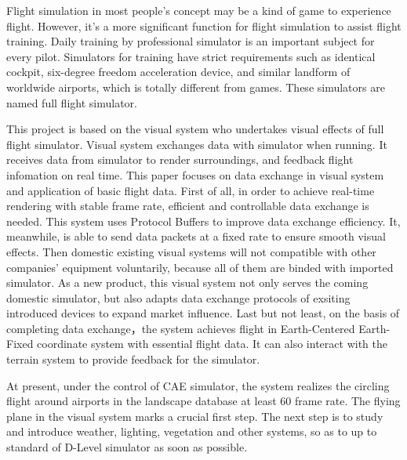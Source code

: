 \begin{abstract*}
    {Flight simulation in most people's concept may be a kind of game to experience flight. 
    However, it's a more significant function for flight simulation to assist flight training. Daily training by professional simulator is an important subject for every pilot.
    Simulators for training have strict requirements such as identical cockpit, six-degree freedom acceleration device, and similar landform of worldwide airports, which is totally different from games. These simulators are named full flight simulator.}
    \par
    This project is based on the visual system who undertakes visual effects of full flight simulator. Visual system exchanges data with simulator when running. It receives data from simulator to render surroundings, and feedback flight infomation on real time.
    This paper focuses on data exchange in visual system and application of basic flight data. First of all, in order to achieve real-time rendering with stable frame rate, efficient and controllable data exchange is needed. This system uses Protocol Buffers to improve data exchange efficiency.
    It, meanwhile, is able to send data packets at a fixed rate to ensure smooth visual effects.
    Then domestic existing visual systems will not compatible with other companies' equipment voluntarily, because all of them are binded with imported simulator.
    As a new product, this visual system not only serves the coming domestic simulator, but also adapts data exchange protocols of exsiting introduced devices to expand market influence. 
    Last but not least, on the basis of completing data exchange，the system achieves flight in Earth-Centered Earth-Fixed coordinate system with essential flight data. It can also interact with the terrain system to provide feedback for the simulator.
    \par
    At present, under the control of CAE simulator, the system realizes the circling flight around airports in the landscape database at least 60 frame rate. The flying plane in the visual system marks a crucial first step.
    The next step is to study and introduce weather, lighting, vegetation and other systems, so as to up to standard of D-Level simulator as soon as possible.
\end{abstract*}